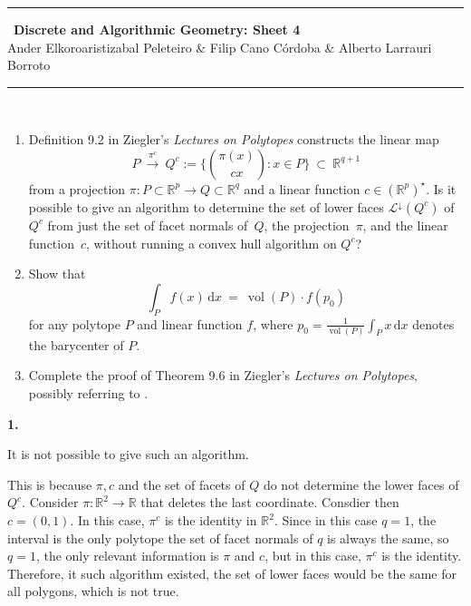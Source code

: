 \documentclass[10pt,a4paper]{article}
\DeclareMathOperator{\vol}{vol}
\newcommand{\RR}{\mathbb{R}}
\theoremstyle{plain}
\theoremstyle{remark}
\theoremstyle{definition}
\begin{document}
    \thispagestyle{plain}
    \begin{center}
        \rule{\linewidth}{0.05mm}\
        {\Large \textbf{Discrete and Algorithmic Geometry: Sheet 4\\}}
        {\large Ander Elkoroaristizabal Peleteiro \& Filip Cano Córdoba \& Alberto Larrauri Borroto\\}
        \rule{\linewidth}{0.05mm}\
    \end{center}
    
    \begin{enumerate}
        \item Definition 9.2 in Ziegler's \emph{Lectures on Polytopes} constructs the linear map
        \[
        P
        \ \xrightarrow{\pi^c}\ 
        Q^c :=
        \Big\{ \binom{\pi(x)}{cx} : x\in P\Big\}
        \ \subset \
        \RR^{q+1}
        \]
        from a projection $\pi:P\subset\RR^p\to Q\subset\RR^q$ and a linear function $c\in(\RR^p)^\star$.
        Is it possible to give an algorithm to determine the set of lower faces 
        $\mathcal L^\downarrow(Q^c)$ of $Q^c$ 
        from just the set of facet normals of~$Q$, 
        the projection~$\pi$, and the linear function~$c$, without running a convex hull algorithm on $Q^c$?
        
        \bigskip\bigskip
        \item Show that
        \[
        \int_P f(x)\,\text{d}x
        \ = \
        \vol(P) \cdot f(p_0)
        \]
        for any polytope $P$ and linear function $f$, 
        where $p_0 = \frac{1}{\vol(P)}\int_P x\,\text{d}x$ denotes the barycenter of $P$.
        \bigskip\bigskip
        \item Complete the proof of Theorem 9.6 in Ziegler's \emph{Lectures on Polytopes}, 
        possibly referring to \cite{bs-1992}.
        
    \end{enumerate}
    
    
    \textbf{1.}
    
    It is not possible to give such an algorithm.
    
    This is because $\pi,c$ and the set of facets of $Q$ do not determine the lower faces of $Q^c$.
    Consider $\pi:\RR^2\to \RR$ that deletes the last coordinate. 
    Consdier then $c=(0,1)$. 
    In this case, $\pi^c$ is the identity in $\RR^2$.
    Since in this case $q=1$, the interval is the only polytope the set of facet normals of $q$ is always the same,
    so $q=1$, the only relevant information is $\pi$ and $c$, but in this case, $\pi^c$ is the identity.
    Therefore, it such algorithm existed, the set of lower faces would be the same for all polygons,
    which is not true.
    
\end{document}
